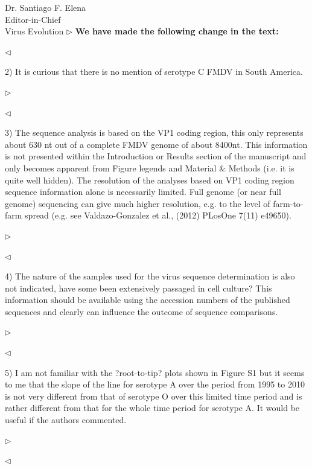 \documentclass[ucla,biomath,12pt,noaddrfooter,datefrom]{UC_letter}
\newenvironment{reply}{$\triangleright$\bf}{$\triangleleft$}
\renewenvironment{quote}
               {\list{}{\rightmargin\leftmargin}%
                \item\relax\normalfont}
               {\endlist}
\begin{document}
\begin{letter}{
Dr. Santiago F. Elena \\
Editor-in-Chief \\
Virus Evolution
}
\begin{reply}
We have made the following change in the text:
\begin{quote}
\myeditThisIsAnEdit
\end{quote}
\end{reply}

2)      It is curious that there is no mention of serotype C FMDV in South America.

\begin{reply}

\end{reply}

3)      The sequence analysis is based on the VP1 coding region, this only represents about 630 nt out of a complete FMDV genome of about 8400nt. 
This information is not presented within the Introduction or Results section of the manuscript and only becomes apparent from Figure legends and Material \& Methods (i.e. it is quite well hidden). 
The resolution of the analyses based on VP1 coding region sequence information alone is necessarily limited. 
Full genome (or near full genome) sequencing can give much higher resolution, e.g. to the level of farm-to-farm spread (e.g. see Valdazo-Gonzalez et al., (2012) PLosOne 7(11) e49650).

\begin{reply}

\end{reply}

4)      The nature of the samples used for the virus sequence determination is also not indicated, have some been extensively passaged in cell culture? 
This information should be available using the accession numbers of the published sequences and clearly can influence the outcome of sequence comparisons.

\begin{reply}

\end{reply}

5)      I am not familiar with the ?root-to-tip? plots shown in Figure S1 but it seems to me that the slope of the line for serotype A over the period from 1995 to 2010 is not very different from that of serotype O over this limited time period and is rather different from that for the whole time period for serotype A. 
It would be useful if the authors commented.

\begin{reply}

\end{reply}


\end{letter}
\end{document}
